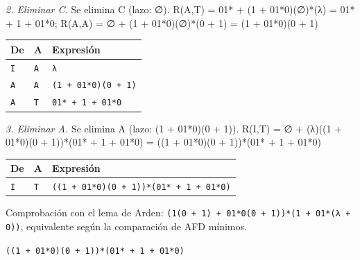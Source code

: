 \documentclass[11pt]{article}
\begin{document}
\textit{2. Eliminar C.} Se elimina C (lazo: ∅). R(A,T) = 01* + (1 + 01*0)(∅)*(λ) = 01* + 1 + 01*0; R(A,A) = ∅ + (1 + 01*0)(∅)*(0 + 1) = (1 + 01*0)(0 + 1)
\begin{center}\footnotesize\begin{tabular}{lll}\toprule
De & A & Expresión \\\midrule
\texttt{I} & \texttt{A} & \texttt{λ} \\
\texttt{A} & \texttt{A} & \texttt{(1 + 01*0)(0 + 1)} \\
\texttt{A} & \texttt{T} & \texttt{01* + 1 + 01*0} \\
\bottomrule\end{tabular}\end{center}
\textit{3. Eliminar A.} Se elimina A (lazo: (1 + 01*0)(0 + 1)). R(I,T) = ∅ + (λ)((1 + 01*0)(0 + 1))*(01* + 1 + 01*0) = ((1 + 01*0)(0 + 1))*(01* + 1 + 01*0)
\begin{center}\footnotesize\begin{tabular}{lll}\toprule
De & A & Expresión \\\midrule
\texttt{I} & \texttt{T} & \texttt{((1 + 01*0)(0 + 1))*(01* + 1 + 01*0)} \\
\bottomrule\end{tabular}\end{center}
Comprobación con el lema de Arden: \texttt{(1(0 + 1) + 01*0(0 + 1))*(1 + 01*(λ + 0))}, equivalente según la comparación de AFD mínimos.

\resp \texttt{((1 + 01*0)(0 + 1))*(01* + 1 + 01*0)}
\end{document}
